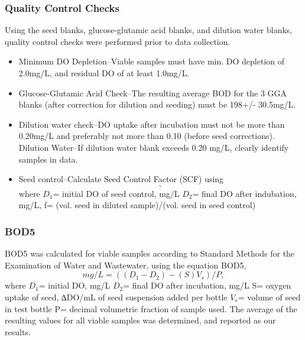 \documentclass{article}\usepackage[]{graphicx}\usepackage[]{color}
\begin{document}
\subsubsection*{Quality Control Checks}
Using the seed blanks, glucose-glutamic acid blanks, and dilution water blanks, quality control checks were performed prior to data collection. 
\begin{itemize}
  \item Minimum DO Depletion--Viable samples must have min. DO depletion of 2.0mg/L, and residual DO of at least 1.0mg/L.
  \item Glucose-Glutamic Acid Check--The resulting average BOD for the 3 GGA blanks (after correction for dilution and seeding) must be 198+/- 30.5mg/L.
  \item Dilution water check--DO uptake after incubation must not be more than 0.20mg/L and preferably not more than 0.10 (before seed corrections). 
  \subitem Dilution Water--If dilution water blank exceeds 0.20 mg/L, clearly identify samples in data.
  \item Seed control--Calculate Seed Control Factor (SCF) using 
  \begin{equation}
  [(D1-D2)*f], 
  \end{equation}
  where
  \subitem $D_1$= initial DO of seed control, mg/L
  \subitem $D_2$= final DO after indubation, mg/L,
  \subitem f= (vol. seed in diluted sample)/(vol. seed in seed control)
\end{itemize}

\subsubsection*{BOD5}
BOD5 was calculated for viable samples according to Standard Methods for the Examination of Water and Wastewater, using the equation 
BOD5,
\begin{equation}
mg/L= ((D_1-D_2)-(S)V_s)/P,
\end{equation}
where 
\subitem $D_1$= initial DO, mg/L
\subitem $D_2$= final DO after incubation, mg/L
\subitem S= oxygen uptake of seed, ∆DO/mL of seed suspension added per bottle
\subitem $V_s$= volume of seed in test bottle
\subitem P= decimal volumetric fraction of sample used.
The average of the resulting values for all viable samples was determined, and reported as our results. 
\end{document}
